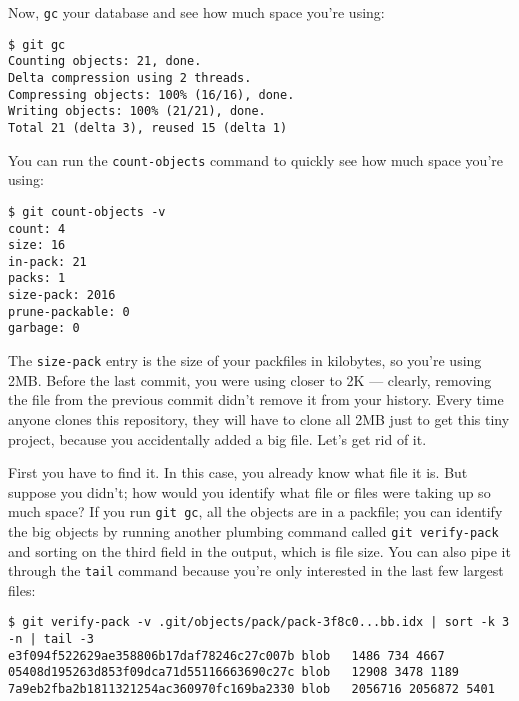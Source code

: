 \documentclass[a4paper]{book}
\newcounter{tab}[chapter]
\begin{document}
Now, \texttt{gc} your database and see how much space you're using:

\begin{shaded}\begin{verbatim}
$ git gc
Counting objects: 21, done.
Delta compression using 2 threads.
Compressing objects: 100% (16/16), done.
Writing objects: 100% (21/21), done.
Total 21 (delta 3), reused 15 (delta 1)
\end{verbatim}\end{shaded}

You can run the \texttt{count-objects} command to quickly see how much space you're using:

\begin{shaded}\begin{verbatim}
$ git count-objects -v
count: 4
size: 16
in-pack: 21
packs: 1
size-pack: 2016
prune-packable: 0
garbage: 0
\end{verbatim}\end{shaded}

The \texttt{size-pack} entry is the size of your packfiles in kilobytes, so you're using 2MB. Before the last commit, you were using closer to 2K --- clearly, removing the file from the previous commit didn't remove it from your history. Every time anyone clones this repository, they will have to clone all 2MB just to get this tiny project, because you accidentally added a big file. Let's get rid of it.

First you have to find it. In this case, you already know what file it is. But suppose you didn't; how would you identify what file or files were taking up so much space? If you run \texttt{git gc}, all the objects are in a packfile; you can identify the big objects by running another plumbing command called \texttt{git verify-pack} and sorting on the third field in the output, which is file size. You can also pipe it through the \texttt{tail} command because you're only interested in the last few largest files:

\begin{shaded}\begin{verbatim}
$ git verify-pack -v .git/objects/pack/pack-3f8c0...bb.idx | sort -k 3 -n | tail -3
e3f094f522629ae358806b17daf78246c27c007b blob   1486 734 4667
05408d195263d853f09dca71d55116663690c27c blob   12908 3478 1189
7a9eb2fba2b1811321254ac360970fc169ba2330 blob   2056716 2056872 5401
\end{verbatim}\end{shaded}
\end{document}
